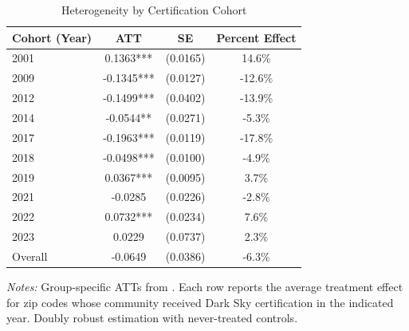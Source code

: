 
\begin{table}[H]
\centering
\caption{Heterogeneity by Certification Cohort}
\label{tab:heterogeneity}
\begin{threeparttable}
\begin{tabular}{lccc}
\toprule
Cohort (Year) & ATT & SE & Percent Effect \\
\midrule
  2001 & 0.1363*** & (0.0165) & 14.6\% \\
  2009 & -0.1345*** & (0.0127) & -12.6\% \\
  2012 & -0.1499*** & (0.0402) & -13.9\% \\
  2014 & -0.0544** & (0.0271) & -5.3\% \\
  2017 & -0.1963*** & (0.0119) & -17.8\% \\
  2018 & -0.0498*** & (0.0100) & -4.9\% \\
  2019 & 0.0367*** & (0.0095) & 3.7\% \\
  2021 & -0.0285 & (0.0226) & -2.8\% \\
  2022 & 0.0732*** & (0.0234) & 7.6\% \\
  2023 & 0.0229 & (0.0737) & 2.3\% \\
\midrule
Overall & -0.0649 & (0.0386) & -6.3\% \\
\bottomrule
\end{tabular}
\begin{tablenotes}[flushleft]
\small
\item \textit{Notes:} Group-specific ATTs from \citet{callaway2021difference}. Each row reports the average treatment effect for zip codes whose community received Dark Sky certification in the indicated year. Doubly robust estimation with never-treated controls.
\end{tablenotes}
\end{threeparttable}
\end{table}
